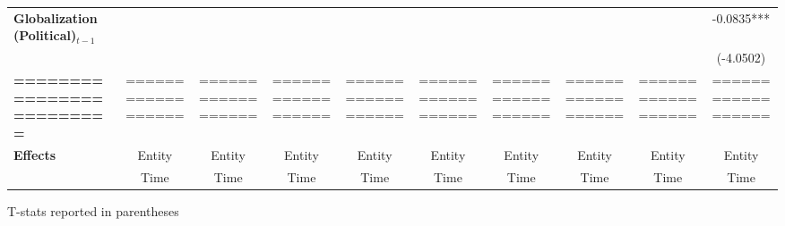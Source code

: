 \begin{center}
\begin{tabular}{lccccccccc}
\textbf{Globalization (Political)$_{t-1}$}             &                    &                    &                    &                    &                    &                    &                    &                    &     -0.0835***      \\
\textbf{ }                         &                    &                    &                    &                    &                    &                    &                    &                    &     (-4.0502)       \\
\textbf{=========================} & ================== & ================== & ================== & ================== & ================== & ================== & ================== & ================== & ==================  \\
\textbf{Effects}                   &       Entity       &       Entity       &       Entity       &       Entity       &       Entity       &       Entity       &       Entity       &       Entity       &       Entity        \\
\textbf{}                          &        Time        &        Time        &        Time        &        Time        &        Time        &        Time        &        Time        &        Time        &        Time         \\
\bottomrule
\end{tabular}
\end{center}

T-stats reported in parentheses